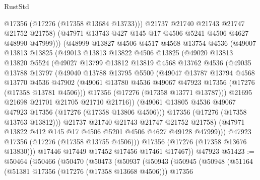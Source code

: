 \begin{lexlean}{RustStd}
\begin{coremodule}
                  @17356
                  (@17276 (@17358 @13684 @13733)))
                @21737
                @21740
                @21743
                @21747
                @21752
                @21758)
              (@47971 @13743 @427 @145 @17 @4506 @5241 @4506 @4627 @48990 @47999)))
          (@48999
            @13827
            @4506
            @4517
            @4568
            @13754
            @4536
            (@49007
              @13813
              @13825
              (@49013
                @13813
                @13822
                @4506
                @13825
                (@49020
                  @13813
                  @13820
                  @5524
                  (@49027
                    @13799
                    @13812
                    @13819
                    @4568
                    @13762
                    @4536
                    (@49035
                      @13788
                      @13797
                      (@49040
                        @13788
                        @13795
                        @5500
                        (@49047
                          @13787
                          @13794
                          @4568
                          @13770
                          @4536
                          @47902
                          (@49061 @13780 @4536 @49067 @47923 @17356 (@17276 (@17358 @13781 @4506)))
                          @17356
                          (@17276 (@17358 @13771 @13787)))
                        @21695
                        @21698
                        @21701
                        @21705
                        @21710
                        @21716))
                    (@49061 @13805 @4536 @49067 @47923 @17356 (@17276 (@17358 @13806 @4506)))
                    @17356
                    (@17276 (@17358 @13763 @13812)))
                  @21737
                  @21740
                  @21743
                  @21747
                  @21752
                  @21758)
                (@47971 @13822 @412 @145 @17 @4506 @5201 @4506 @4627 @49128 @47999)))
            @47923
            @17356
            (@17276 (@17358 @13755 @4506)))
          @17356
          (@17276 (@17358 @13676 @13830)))
        @17446
        @17449
        @17452
        @17456
        @17461
        @17467))
    @47923
@51423 := @50464
    (@50466
      (@50470
        (@50473
          (@50937
            (@50943
              (@50945
                (@50948
                  (@51164
                    (@51381 @17356 (@17276 (@17358 @13668 @4506)))
                    @17356

\end{coremodule}
\end{lexlean}
